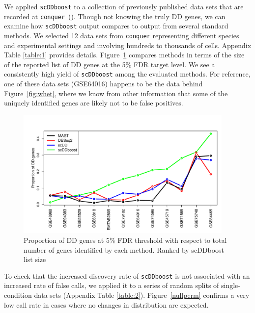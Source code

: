\documentclass[aoas,preprint]{imsart}
\begin{document}
We applied \verb+scDDboost+ to a collection of previously published
data sets that are recorded at \verb+conquer+~(\cite{ref:Cq}).  
Though not knowing the truly DD
genes, we can examine how \verb+scDDboost+ output compares to output from several standard methods.  We selected
12 data sets from \verb+conquer+   representing different species and experimental settings
and involving hundreds to thousands of cells.   Appendix Table \ref{table:1} provides details.  Figure~\ref{fig:es} compares
methods in terms of the size of the reported list of DD genes at the 5\% FDR target level.  
We see a consistently high yield of \verb+scDDboost+ among the evaluated  methods.  For reference, one of these data 
sets (GSE64016) happens to be the data behind Figure~\ref{fig:whet}, where we know from other information that some
of the uniquely identified genes are likely not to be false positives.


\begin{figure}[H]
\includegraphics[width = 0.95\textwidth]{Figs/DD95.pdf}
 \caption{Proportion of DD genes at 5\% FDR threshold with respect to total number of genes identified by each method. Ranked by 
 scDDboost list size }
  \label{fig:es}
\end{figure}


To check that the increased discovery rate
of   \verb+scDDboost+ is  not associated with an increased rate of false calls, we 
applied it to a series of random splits of single-condition data sets (Appendix Table \ref{table:2}). Figure~\ref{nullperm}
confirms a very low call rate in cases where no changes in distribution are expected.
\end{document}
